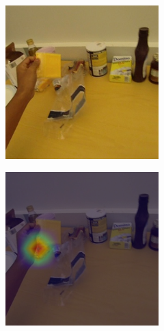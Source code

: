 \documentclass[10pt,twocolumn,hidelinks,letterpaper]{article}
\begin{document}
\begin{figure}
\begin{subfigure}{.24\linewidth}
  \end{subfigure}
  \begin{subfigure}{.24\linewidth}
  	\includegraphics[width=\linewidth]{images/Cams1/S2_take_cheese/rgb0027.png}
  \end{subfigure}
  \begin{subfigure}{.24\linewidth}
  	\includegraphics[width=\linewidth]{images/Cams1/S2_take_cheese/rgb0027_CAM.png}
  \end{subfigure}
  \caption{}
  \label{cams1}
\end{figure}
\end{document}
